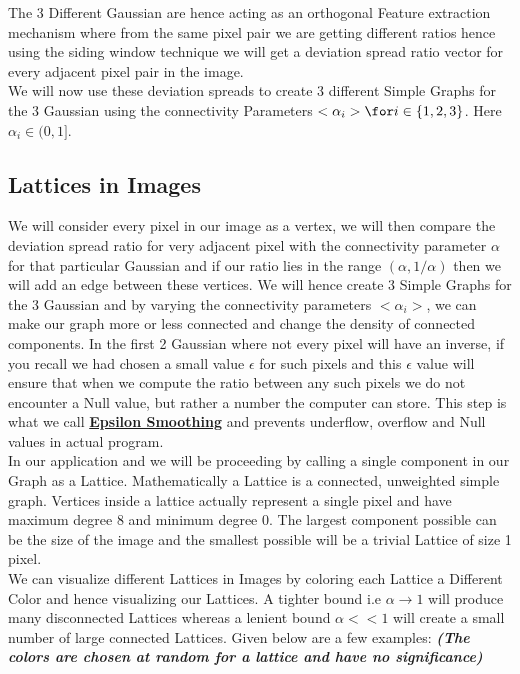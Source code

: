 \documentclass{article}
\begin{document}
The 3 Different Gaussian are hence acting as an orthogonal Feature extraction mechanism where from the 
same pixel pair we are getting different ratios hence using the siding window technique we will get a
deviation spread ratio vector for every adjacent pixel pair in the image. \\

We will now use these deviation spreads to create 3 different Simple Graphs for the 3 Gaussian using 
the connectivity Parameters $<\alpha_i> \for i \in \{1, 2, 3\}$. Here $\alpha_i \in (0, 1]$.

\subsection{Lattices in Images}
We will consider every pixel in our image as a vertex, we will then compare the deviation spread ratio 
for very adjacent pixel with the connectivity parameter $\alpha$ for that particular Gaussian and if 
our ratio lies in the range $(\alpha, 1 / \alpha)$ then we will add an edge between these vertices. We will hence create 3 Simple Graphs for the 3 Gaussian and by varying the connectivity parameters $<\alpha_i>$, we can make our graph more or less connected and change the density of connected components.
In the first 2 Gaussian where not every pixel will have an inverse, if you recall we had chosen a small value $\epsilon$ for such pixels and this $\epsilon$ value will ensure that when we compute the ratio between any such pixels we do not encounter a Null value, but rather a number the computer can store. This step is what we call \underline{\textbf{Epsilon Smoothing}} and prevents underflow, overflow and Null values in actual program. \\

In our application and we will be proceeding by calling a single component in our Graph as a Lattice. 
Mathematically a Lattice is a connected, unweighted simple graph. Vertices inside a lattice actually represent a single pixel and have maximum degree 8 and minimum degree 0. The largest component possible
can be the size of the image and the smallest possible will be a trivial Lattice of size 1 pixel. \\

We can visualize different Lattices in Images by coloring each Lattice a Different Color and hence visualizing our Lattices. A tighter bound i.e $\alpha \rightarrow 1$ will produce many disconnected Lattices whereas a lenient bound $\alpha << 1$ will create a small number of large connected Lattices. Given below are a few examples: \textbf{\textit{(The colors are chosen at random for a lattice and have no significance)}}
\end{document}
